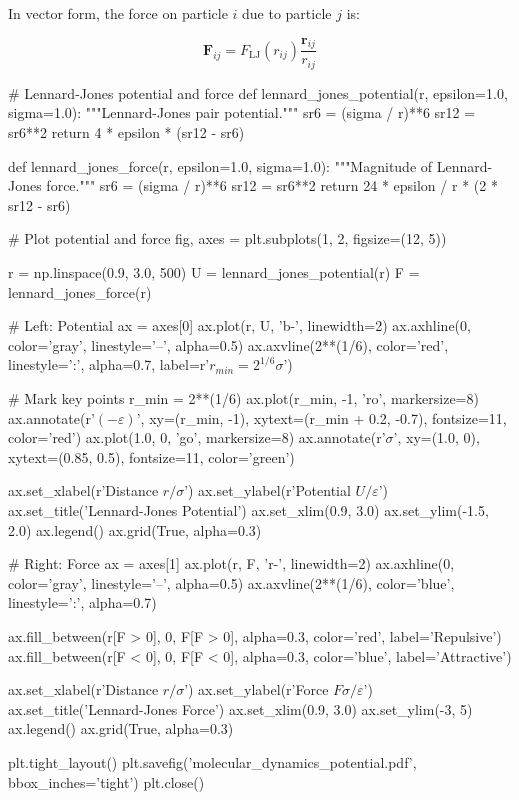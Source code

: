 \documentclass[11pt,a4paper]{article}
\newcommand{\vect}[1]{\mathbf{#1}}
\begin{document}
In vector form, the force on particle $i$ due to particle $j$ is:

\begin{equation}
\vect{F}_{ij} = F_{\text{LJ}}(r_{ij}) \frac{\vect{r}_{ij}}{r_{ij}}
\end{equation}

\begin{pycode}
# Lennard-Jones potential and force
def lennard_jones_potential(r, epsilon=1.0, sigma=1.0):
    """Lennard-Jones pair potential."""
    sr6 = (sigma / r)**6
    sr12 = sr6**2
    return 4 * epsilon * (sr12 - sr6)

def lennard_jones_force(r, epsilon=1.0, sigma=1.0):
    """Magnitude of Lennard-Jones force."""
    sr6 = (sigma / r)**6
    sr12 = sr6**2
    return 24 * epsilon / r * (2 * sr12 - sr6)

# Plot potential and force
fig, axes = plt.subplots(1, 2, figsize=(12, 5))

r = np.linspace(0.9, 3.0, 500)
U = lennard_jones_potential(r)
F = lennard_jones_force(r)

# Left: Potential
ax = axes[0]
ax.plot(r, U, 'b-', linewidth=2)
ax.axhline(0, color='gray', linestyle='--', alpha=0.5)
ax.axvline(2**(1/6), color='red', linestyle=':', alpha=0.7, label=r'$r_{min} = 2^{1/6}\sigma$')

# Mark key points
r_min = 2**(1/6)
ax.plot(r_min, -1, 'ro', markersize=8)
ax.annotate(r'$(-\varepsilon)$', xy=(r_min, -1), xytext=(r_min + 0.2, -0.7),
            fontsize=11, color='red')
ax.plot(1.0, 0, 'go', markersize=8)
ax.annotate(r'$\sigma$', xy=(1.0, 0), xytext=(0.85, 0.5), fontsize=11, color='green')

ax.set_xlabel(r'Distance $r/\sigma$')
ax.set_ylabel(r'Potential $U/\varepsilon$')
ax.set_title('Lennard-Jones Potential')
ax.set_xlim(0.9, 3.0)
ax.set_ylim(-1.5, 2.0)
ax.legend()
ax.grid(True, alpha=0.3)

# Right: Force
ax = axes[1]
ax.plot(r, F, 'r-', linewidth=2)
ax.axhline(0, color='gray', linestyle='--', alpha=0.5)
ax.axvline(2**(1/6), color='blue', linestyle=':', alpha=0.7)

ax.fill_between(r[F > 0], 0, F[F > 0], alpha=0.3, color='red', label='Repulsive')
ax.fill_between(r[F < 0], 0, F[F < 0], alpha=0.3, color='blue', label='Attractive')

ax.set_xlabel(r'Distance $r/\sigma$')
ax.set_ylabel(r'Force $F\sigma/\varepsilon$')
ax.set_title('Lennard-Jones Force')
ax.set_xlim(0.9, 3.0)
ax.set_ylim(-3, 5)
ax.legend()
ax.grid(True, alpha=0.3)

plt.tight_layout()
plt.savefig('molecular_dynamics_potential.pdf', bbox_inches='tight')
plt.close()
\end{pycode}
\end{document}
